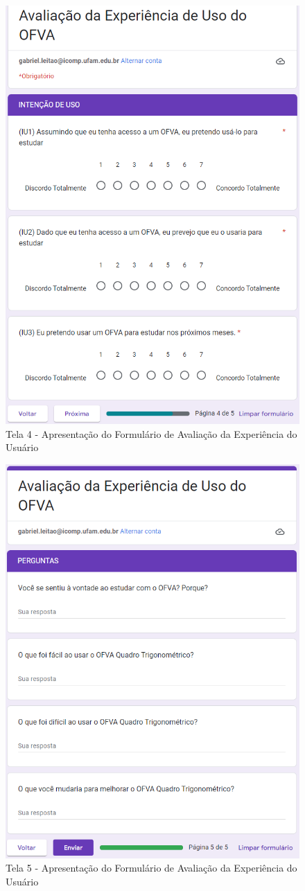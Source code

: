 \begin{figure}[htb]
	\centering
	\includegraphics[width=0.8\linewidth]{chapters/appendixUX/UX_Tela4.png}
	\caption{Tela 4 - Apresentação do Formulário de Avaliação da Experiência do Usuário}
	\label{fig:UX_Tela4}
\end{figure}


\begin{figure}[htb]
	\centering
	\includegraphics[width=0.8\linewidth]{chapters/appendixUX/UX_Tela5.png}
	\caption{Tela 5 - Apresentação do Formulário de Avaliação da Experiência do Usuário}
	\label{fig:UX_Tela5}
\end{figure}

